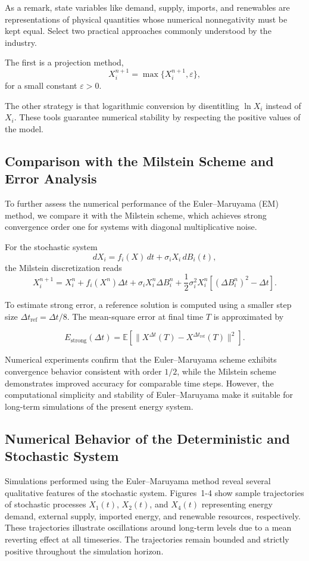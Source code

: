 \documentclass[11pt]{article}
\numberwithin{equation}{section}
\begin{document}
As a remark, state variables like demand, supply, imports, and renewables are representations of physical quantities whose numerical nonnegativity must be kept equal. Select two practical approaches commonly understood by the industry.

The first is a projection method,
\[
X_i^{n+1} = \max\{ X_i^{n+1}, \varepsilon \},
\]
for a small constant $\varepsilon > 0$.

The other strategy is that logarithmic conversion by disentitling $\ln X_i$ instead of $X_i$. These tools guarantee numerical stability by respecting the positive values of the model.

\subsection{Comparison with the Milstein Scheme and Error Analysis}

To further assess the numerical performance of the Euler--Maruyama (EM) method, we compare it with the Milstein scheme, which achieves strong convergence order one for systems with diagonal multiplicative noise.

For the stochastic system
\[
dX_i = f_i(X)\,dt + \sigma_i X_i\, dB_i(t),
\]
the Milstein discretization reads
\[
X_i^{n+1}
=
X_i^n
+
f_i(X^n)\Delta t
+
\sigma_i X_i^n \Delta B_i^n
+
\frac{1}{2}\sigma_i^2 X_i^n
\left[(\Delta B_i^n)^2 - \Delta t\right].
\]

To estimate strong error, a reference solution is computed using a smaller step size 
$\Delta t_{\mathrm{ref}} = \Delta t/8$. The mean-square error at final time $T$ is approximated by

\[
E_{\mathrm{strong}}(\Delta t)
=
\mathbb{E}
\left[
\|X^{\Delta t}(T) - X^{\Delta t_{\mathrm{ref}}}(T)\|^2
\right].
\]

Numerical experiments confirm that the Euler--Maruyama scheme exhibits convergence behavior consistent with order $1/2$, while the Milstein scheme demonstrates improved accuracy for comparable time steps. However, the computational simplicity and stability of Euler--Maruyama make it suitable for long-term simulations of the present energy system.

\subsection{Numerical Behavior of the Deterministic and Stochastic System}

Simulations performed using the Euler–Maruyama method reveal several qualitative features of the stochastic system. Figures~1-4 show sample trajectories of stochastic processes $X_1(t)$, $X_2(t)$, and $X_4(t)$ representing energy demand, external supply, imported energy, and renewable resources, respectively. These trajectories illustrate oscillations around long-term levels due to a mean reverting effect at all timeseries. The trajectories remain bounded and strictly positive throughout the simulation horizon.
\end{document}
